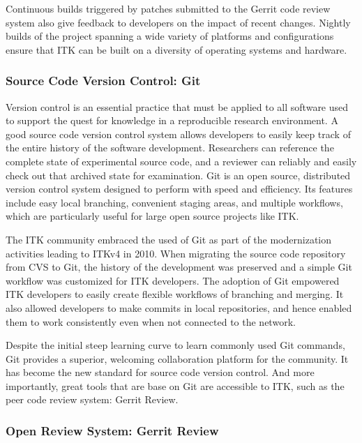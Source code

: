 \documentclass{frontiersENG} %
\begin{document}
Continuous builds triggered by patches submitted to the Gerrit code review
system also give feedback to developers on the impact of recent changes.
Nightly builds of the project spanning a wide variety of platforms and
configurations ensure that ITK can be built on a diversity of operating systems
and hardware.


\subsubsection{Source Code Version Control: Git}

Version control is an essential practice that must be applied to all software
used to support the quest for knowledge in a reproducible research environment.
A good source code version control system allows developers to easily keep
track of the entire history of the software development. Researchers can
reference the complete state of experimental source code, and a reviewer can
reliably and easily check out that archived state for examination.  Git is an
open source, distributed version control system designed to perform with speed
and efficiency. Its features include easy local branching, convenient staging
areas, and multiple workflows, which are particularly useful for large open
source projects like ITK.

The ITK community embraced the used of Git as part of the modernization
activities leading to ITKv4 in 2010.  When migrating the source code repository
from CVS to Git, the history of the development was preserved and a simple Git
workflow was customized for ITK developers.  The adoption of Git empowered ITK
developers to easily create flexible workflows of branching and merging. It
also allowed developers to make commits in local repositories, and hence
enabled them to work consistently even when not connected to the network.

Despite the initial steep learning curve to learn commonly used Git commands,
Git provides a superior, welcoming collaboration platform for the community. It
has become the new standard for source code version control.  And more
importantly, great tools that are base on Git are accessible to ITK, such as
the peer code review system: Gerrit Review.


\subsubsection{Open Review System: Gerrit Review}
\end{document}
